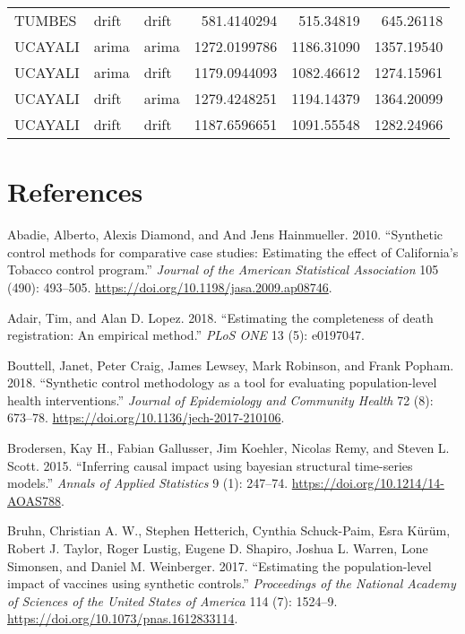 \documentclass[
]{article}
\begin{document}
\begin{table}[!h]
\begin{tabular}[t]{lllrrr}
\addlinespace
TUMBES & drift & drift & 581.4140294 & 515.34819 & 645.26118\\
UCAYALI & arima & arima & 1272.0199786 & 1186.31090 & 1357.19540\\
UCAYALI & arima & drift & 1179.0944093 & 1082.46612 & 1274.15961\\
UCAYALI & drift & arima & 1279.4248251 & 1194.14379 & 1364.20099\\
UCAYALI & drift & drift & 1187.6596651 & 1091.55548 & 1282.24966\\
\bottomrule
\end{tabular}
\end{table}

\hypertarget{references}{%
\section*{References}\label{references}}

\hypertarget{refs}{}
\leavevmode\hypertarget{ref-Abadie2010}{}%
Abadie, Alberto, Alexis Diamond, and And Jens Hainmueller. 2010. ``Synthetic control methods for comparative case studies: Estimating the effect of California's Tobacco control program.'' \emph{Journal of the American Statistical Association} 105 (490): 493--505. \url{https://doi.org/10.1198/jasa.2009.ap08746}.

\leavevmode\hypertarget{ref-Adair2018}{}%
Adair, Tim, and Alan D. Lopez. 2018. ``Estimating the completeness of death registration: An empirical method.'' \emph{PLoS ONE} 13 (5): e0197047.

\leavevmode\hypertarget{ref-Bouttell2018}{}%
Bouttell, Janet, Peter Craig, James Lewsey, Mark Robinson, and Frank Popham. 2018. ``Synthetic control methodology as a tool for evaluating population-level health interventions.'' \emph{Journal of Epidemiology and Community Health} 72 (8): 673--78. \url{https://doi.org/10.1136/jech-2017-210106}.

\leavevmode\hypertarget{ref-Brodersen2015}{}%
Brodersen, Kay H., Fabian Gallusser, Jim Koehler, Nicolas Remy, and Steven L. Scott. 2015. ``Inferring causal impact using bayesian structural time-series models.'' \emph{Annals of Applied Statistics} 9 (1): 247--74. \url{https://doi.org/10.1214/14-AOAS788}.

\leavevmode\hypertarget{ref-Bruhn2017}{}%
Bruhn, Christian A. W., Stephen Hetterich, Cynthia Schuck-Paim, Esra Kürüm, Robert J. Taylor, Roger Lustig, Eugene D. Shapiro, Joshua L. Warren, Lone Simonsen, and Daniel M. Weinberger. 2017. ``Estimating the population-level impact of vaccines using synthetic controls.'' \emph{Proceedings of the National Academy of Sciences of the United States of America} 114 (7): 1524--9. \url{https://doi.org/10.1073/pnas.1612833114}.
\end{document}
